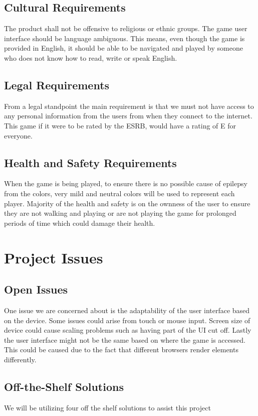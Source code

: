 \documentclass[12pt, titlepage]{article}
\begin{document}
\subsection{Cultural Requirements}

The product shall not be offensive to religious or ethnic groups. The game user
interface should be language ambiguous. This means, even though the game is
provided in English, it should be able to be navigated and played by someone who
does not know how to read, write or speak English.

\subsection{Legal Requirements}
From a legal standpoint the main requirement is that we must not have access to
any personal information from the users from when they connect to the internet.
This game if it were to be rated by the ESRB, would have a rating of E for
everyone.

\subsection{Health and Safety Requirements}
When the game is being played, to ensure there is no possible cause of epilepsy
from the colors, very mild and neutral colors will be used to represent each
player. Majority of the health and safety is on the ownness of the user to
ensure they are not walking and playing or are not playing the game for
prolonged periods of time which could damage their health.

\section{Project Issues}

\subsection{Open Issues}
One issue we are concerned about is the adaptability of the user interface based
on the device. Some issues could arise from touch or mouse
input. Screen size of device could cause scaling problems such as having
part of the UI cut off. Lastly the user interface might not be the same based on
where the game is accessed. This could be caused due to the fact that different 
browsers render elements differently.

\subsection{Off-the-Shelf Solutions}
We will be utilizing four off the shelf solutions to assist this project 
\end{document}
